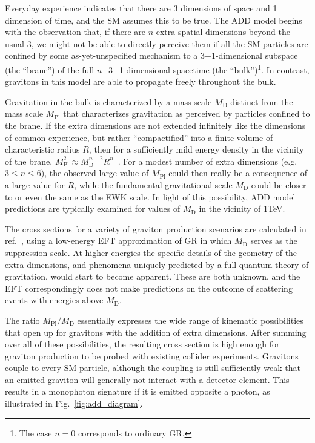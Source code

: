 Everyday experience indicates that there are 3 dimensions of space and 1 dimension of time, and the SM assumes this to be true.
The ADD model begins with the observation that, if there are $n$ extra spatial dimensions beyond the usual 3,
we might not be able to directly perceive them if all the SM particles are confined by some as-yet-unspecified
mechanism to a 3+1-dimensional subspace (the ``brane'') of the full $n$+3+1-dimensional spacetime (the ``bulk'')\footnote{The case $n=0$ corresponds
to ordinary GR.}. In contrast, gravitons in this model are able to propagate freely throughout the bulk.

Gravitation in the bulk is characterized by a mass scale $M_\mathrm{D}$ distinct from the mass scale $M_\mathrm{Pl}$ that
characterizes gravitation as perceived by particles confined to the brane. If the extra dimensions are not extended infinitely like the
dimensions of common experience, but rather ``compactified'' into a finite volume of characteristic radius $R$, then for a sufficiently mild
energy density in the vicinity of the brane, $M_\mathrm{Pl}^{2} \approx M_\mathrm{D}^{n+2} R^{n}$~\cite{ref:S0370-2693(98)00466-3, ref:S0550-3213(99)00044-9}.
For a modest number of extra dimensions (e.g. $3 \leq n \leq 6$), the observed large value of $M_\mathrm{Pl}$ could then really
be a consequence of a large value for $R$, while the fundamental gravitational scale $M_\mathrm{D}$ could be closer to or even
the same as the EWK scale. In light of this possibility, ADD model predictions are typically examined for values of $M_\mathrm{D}$ in the vicinity of 1\unit{TeV}.

The cross sections for a variety of graviton production scenarios are calculated in ref.~\cite{ref:S0550-3213(99)00044-9}, using a low-energy EFT
approximation of GR in which $M_\mathrm{D}$ serves as the suppression scale. At higher energies the specific details of the geometry of the extra dimensions,
and phenomena uniquely predicted by a full quantum theory of gravitation, would start to become apparent. These are both unknown, and the EFT correspondingly
does not make predictions on the outcome of scattering events with energies above $M_\mathrm{D}$.

The ratio $M_\mathrm{Pl} / M_\mathrm{D}$ essentially expresses the wide range of kinematic possibilities that open up for gravitons with the addition
of extra dimensions. After summing over all of these possibilities, the resulting cross section is high enough for graviton production to be probed with existing collider experiments.
Gravitons couple to every SM particle, although the coupling is still sufficiently weak that an emitted graviton will generally not interact with a detector element.
This results in a monophoton signature if it is emitted opposite a photon, as illustrated in Fig.~\ref{fig:add_diagram}.

